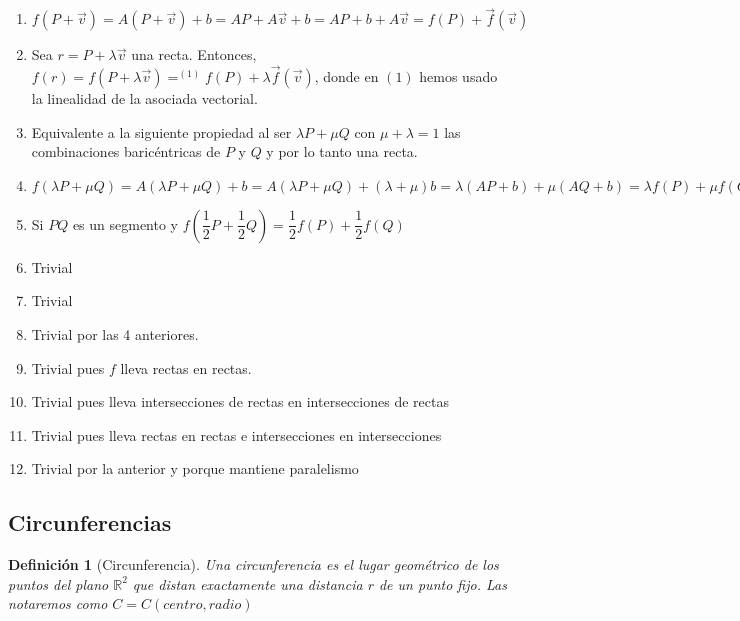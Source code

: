 \documentclass[11pt, a4paper, titlepage]{article}
\makeatletter
\renewenvironment{proof}[1][\proofname] {\vspace{-15pt}\par\pushQED{\qed}\normalfont\topsep6\p@\@plus6\p@\relax\trivlist\item[\hskip\labelsep\it#1\@addpunct{.}]\ignorespaces}{\popQED\endtrivlist\@endpefalse}
\newcommand{\R}{\mathbb{R}}
\renewcommand{\vec}{\overrightarrow}
\renewenvironment{proof}[1][\proofname] {\par\pushQED{\qed}\normalfont\topsep6\p@\@plus6\p@\relax\trivlist\item[\hskip\labelsep\itshape\sffamily#1\@addpunct{.}]\ignorespaces}{\popQED\endtrivlist\@endpefalse}
\theoremstyle{theorem-style}
\theoremstyle{definition-style}
\newtheorem{ndef}{Definición}[section]
\theoremstyle{remark-style}
\newtheorem*{nota}{Nota}
\theoremstyle{example-style}
\makeatother
\begin{document}
\begin{proof}\hfill
  \begin{enumerate}
  \item $f(P+\vec{v}) = A(P+\vec{v}) + b = AP + A\vec{v} + b = AP + b + A\vec{v} = f(P) + \vec{f}(\vec{v})$
  \item Sea $r = P + \lambda \vec{v}$ una recta. Entonces, $f(r) = f(P + \lambda \vec{v}) =^{(1)} f(P) + \lambda \vec{f}(\vec{v})$, donde en $(1)$ hemos usado la linealidad de la asociada vectorial.
  \item Equivalente a la siguiente propiedad al ser $\lambda P + \mu Q$ con $\mu+\lambda = 1$ las combinaciones baricéntricas de $P$ y $Q$ y por lo tanto una recta.
  \item $f(\lambda P + \mu Q) = A(\lambda P + \mu Q) + b =A(\lambda P + \mu Q) + (\lambda + \mu)b = \lambda (AP + b) + \mu (AQ + b) = \lambda f(P) + \mu f(Q)  $
  \item Si $PQ$ es un segmento y $f(\dfrac{1}{2}P + \dfrac{1}{2}Q) = \dfrac{1}{2}f(P) +  \dfrac{1}{2}f(Q)$
  \item Trivial
  \item Trivial
  \item Trivial por las 4 anteriores.
  \item Trivial pues $f$ lleva rectas en rectas.
  \item Trivial pues lleva intersecciones de rectas en intersecciones de rectas
  \item Trivial pues lleva rectas en rectas e intersecciones en intersecciones
  \item Trivial por la anterior y porque mantiene paralelismo

    
  \end{enumerate}
\end{proof}




\subsection{Circunferencias}

\begin{ndef}[Circunferencia]
  Una circunferencia es el lugar geométrico de los puntos del plano $\R^2$ que distan exactamente una distancia $r$ de un punto fijo. Las notaremos como $C = C(centro,radio)$
\end{ndef}
\end{document}
